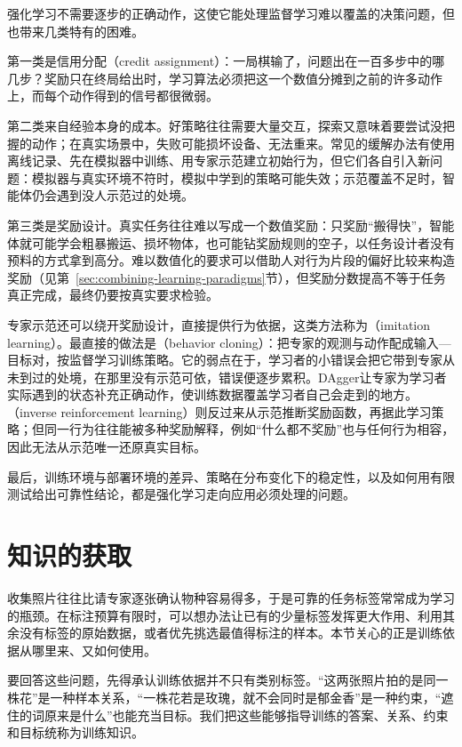 强化学习不需要逐步的正确动作，这使它能处理监督学习难以覆盖的决策问题，但也带来几类特有的困难。

第一类是信用分配（credit assignment）：一局棋输了，问题出在一百多步中的哪几步？奖励只在终局给出时，学习算法必须把这一个数值分摊到之前的许多动作上，而每个动作得到的信号都很微弱。

第二类来自经验本身的成本。好策略往往需要大量交互，探索又意味着要尝试没把握的动作；在真实场景中，失败可能损坏设备、无法重来。常见的缓解办法有使用离线记录、先在模拟器中训练、用专家示范建立初始行为，但它们各自引入新问题：模拟器与真实环境不符时，模拟中学到的策略可能失效；示范覆盖不足时，智能体仍会遇到没人示范过的处境。

第三类是奖励设计。真实任务往往难以写成一个数值奖励：只奖励“搬得快”，智能体就可能学会粗暴搬运、损坏物体，也可能钻奖励规则的空子，以任务设计者没有预料的方式拿到高分。难以数值化的要求可以借助人对行为片段的偏好比较来构造奖励（见第~\ref{sec:combining-learning-paradigms}节），但奖励分数提高不等于任务真正完成，最终仍要按真实要求检验。

专家示范还可以绕开奖励设计，直接提供行为依据，这类方法称为（imitation learning）。最直接的做法是（behavior cloning）：把专家的观测与动作配成输入—目标对，按监督学习训练策略。它的弱点在于，学习者的小错误会把它带到专家从未到过的处境，在那里没有示范可依，错误便逐步累积。DAgger让专家为学习者实际遇到的状态补充正确动作，使训练数据覆盖学习者自己会走到的地方。（inverse reinforcement learning）则反过来从示范推断奖励函数，再据此学习策略；但同一行为往往能被多种奖励解释，例如“什么都不奖励”也与任何行为相容，因此无法从示范唯一还原真实目标。

最后，训练环境与部署环境的差异、策略在分布变化下的稳定性，以及如何用有限测试给出可靠性结论，都是强化学习走向应用必须处理的问题。

\section{知识的获取}
\label{sec:efficient-knowledge-use-overview}

收集照片往往比请专家逐张确认物种容易得多，于是可靠的任务标签常常成为学习的瓶颈。在标注预算有限时，可以想办法让已有的少量标签发挥更大作用、利用其余没有标签的原始数据，或者优先挑选最值得标注的样本。本节关心的正是训练依据从哪里来、又如何使用。

要回答这些问题，先得承认训练依据并不只有类别标签。“这两张照片拍的是同一株花”是一种样本关系，“一株花若是玫瑰，就不会同时是郁金香”是一种约束，“遮住的词原来是什么”也能充当目标。我们把这些能够指导训练的答案、关系、约束和目标统称为训练知识。

